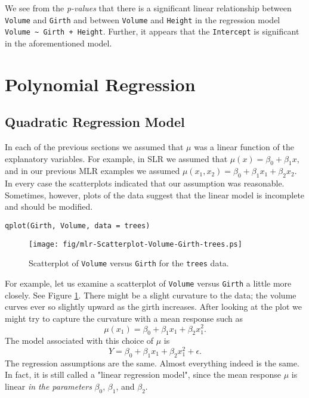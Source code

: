 We see from the \emph{p-values} that there is a significant linear
relationship between \texttt{Volume} and \texttt{Girth} and between \texttt{Volume} and
\texttt{Height} in the regression model \texttt{Volume \textasciitilde{} Girth + Height}. Further,
it appears that the \texttt{Intercept} is significant in the aforementioned
model.

\section{Polynomial Regression}
\label{sec-12-4}

\subsection{Quadratic Regression Model}
\label{sec-12-4-1}

In each of the previous sections we assumed that \(\mu\) was a linear
function of the explanatory variables. For example, in SLR we assumed
that \(\mu(x)=\beta_{0}+\beta_{1}x\), and in our previous MLR examples
we assumed \(\mu(x_{1},x_{2}) = \beta_{0}+\beta_{1}x_{1} +
\beta_{2}x_{2}\). In every case the scatterplots indicated that our
assumption was reasonable. Sometimes, however, plots of the data
suggest that the linear model is incomplete and should be modified.

\begin{verbatim}
qplot(Girth, Volume, data = trees)
\end{verbatim}

\begin{figure}[ht!]
\centering
\texttt{[image: fig/mlr-Scatterplot-Volume-Girth-trees.ps]}
\caption[Scatterplot of \texttt{Volume} versus \texttt{Girth} for the \texttt{trees} data]{\label{fig-Scatterplot-Volume-Girth-trees}\small Scatterplot of \texttt{Volume} versus \texttt{Girth} for the \texttt{trees} data.}
\end{figure}

For example, let us examine a scatterplot of \texttt{Volume} versus \texttt{Girth} a
little more closely. See Figure \ref{fig-Scatterplot-Volume-Girth-trees}. There
might be a slight curvature to the data; the volume curves ever so
slightly upward as the girth increases. After looking at the plot we
might try to capture the curvature with a mean response such as
\begin{equation}
\mu(x_{1})=\beta_{0}+\beta_{1}x_{1}+\beta_{2}x_{1}^{2}.
\end{equation}
The model associated with this choice of \(\mu\) is
\begin{equation}
Y=\beta_{0}+\beta_{1}x_{1}+\beta_{2}x_{1}^{2}+\epsilon.
\end{equation}
The regression assumptions are the same. Almost everything indeed is
the same. In fact, it is still called a "linear regression model",
since the mean response \(\mu\) is linear \emph{in the parameters}
\(\beta_{0}\), \(\beta_{1}\), and \(\beta_{2}\).

